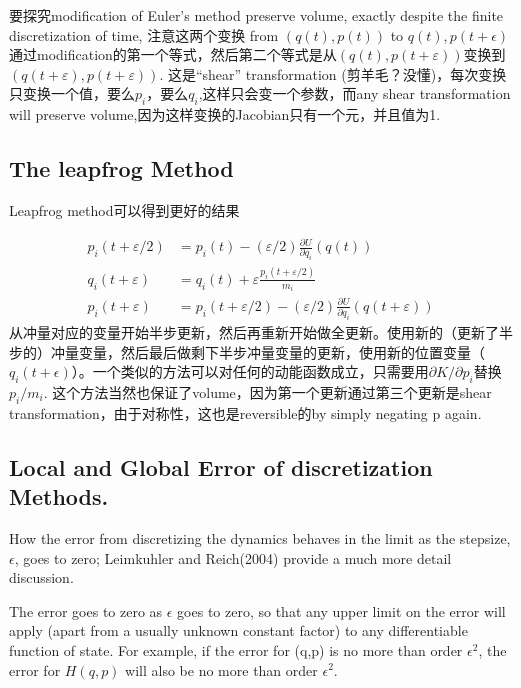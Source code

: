 \documentclass[
]{book}
\theoremstyle{definition}
\theoremstyle{definition}
\theoremstyle{definition}
\theoremstyle{remark}
\begin{document}
要探究modification of Euler's method preserve volume, exactly despite the finite discretization of time, 注意这两个变换 from \((q(t), p(t))\) to \(q(t),p(t+\epsilon)\) 通过modification的第一个等式，然后第二个等式是从\((q(t), p(t+\varepsilon))\)变换到\((q(t+\varepsilon), p(t+\varepsilon))\). 这是``shear'' transformation (剪羊毛？没懂)，每次变换只变换一个值，要么\(p_i\)，要么\(q_i\),这样只会变一个参数，而any shear transformation will preserve volume,因为这样变换的Jacobian只有一个元，并且值为1.

\hypertarget{the-leapfrog-method}{%
\subsection{The leapfrog Method}\label{the-leapfrog-method}}

Leapfrog method可以得到更好的结果

\[
\begin{aligned} p_{i}(t+\varepsilon / 2) &=p_{i}(t)-(\varepsilon / 2) \frac{\partial U}{\partial q_{i}}(q(t)) \\ q_{i}(t+\varepsilon) &=q_{i}(t)+\varepsilon \frac{p_{i}(t+\varepsilon / 2)}{m_{i}} \\ p_{i}(t+\varepsilon) &=p_{i}(t+\varepsilon / 2)-(\varepsilon / 2) \frac{\partial U}{\partial q_{i}}(q(t+\varepsilon)) \end{aligned}
\]
从冲量对应的变量开始半步更新，然后再重新开始做全更新。使用新的（更新了半步的）冲量变量，然后最后做剩下半步冲量变量的更新，使用新的位置变量（\(q_i(t+\epsilon)\)）。一个类似的方法可以对任何的动能函数成立，只需要用\(\partial K / \partial p_{i}\)替换\(p_{i} / m_{i}\).
这个方法当然也保证了volume，因为第一个更新通过第三个更新是shear transformation，由于对称性，这也是reversible的by simply negating p again.

\hypertarget{local-and-global-error-of-discretization-methods.}{%
\subsection{Local and Global Error of discretization Methods.}\label{local-and-global-error-of-discretization-methods.}}

How the error from discretizing the dynamics behaves in the limit as the stepsize, \(\epsilon\), goes to zero; Leimkuhler and Reich(2004) provide a much more detail discussion.

The error goes to zero as \(\epsilon\) goes to zero, so that any upper limit on the error will apply (apart from a usually unknown constant factor) to any differentiable function of state. For example, if the error for (q,p) is no more than order \(\epsilon^2\), the error for \(H(q,p)\) will also be no more than order \(\epsilon^2\).
\end{document}
